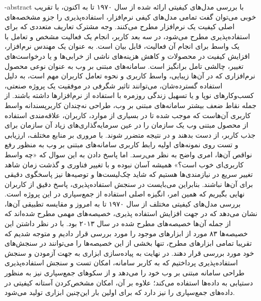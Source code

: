 \fa-abstract{
با بررسی مدل‌های کیفیتی ارائه شده از سال ۱۹۷۰ تا به اکنون، با تقریب خوبی می‌توان گفت تمامی مدل‌های کیفی نرم‌افزار، استفاده‌پذیری را جزو مشخصه‌های اصلی کیفیت یک نرم‌افزار مطرح می‌کنند. وجه مشترک تعاریف متعددی که برای استفاده‌پذیری مطرح می‌شود، در سه بعد کاربر، انجام یک فعالیت مشخص و تعامل با یک واسط برای انجام آن فعالیت، قابل بیان است. به عنوان یک مهندس نرم‌افزار، افزایش کیفیت در محصولات و کاهش هزینه‌های ناشی از خرابی‌ها و یا درخواست‌های تغییر، چالشی تامل برانگیز است. سامانه‌های مبتنی بر وب به عنوان نوعی محصول نرم‌افزاری که در آن‌ها زیبایی، واسط کاربری و نحوه تعامل کاربران مهم است، به دلیل استفاده گسترده‌شان، می‌توانند تاثیر شگرفی در موفقیت یک پروژه صنعتی، کسب‌وکارهای نوپا و یا تسهیل زندگی روزمره با استفاده از نرم‌افزارها داشته باشند. از جمله نقاط ضعف بیشتر سامانه‌های مبتنی بر وب، طراحی نه‌چندان کاربرپسندانه واسط کاربری آن‌هاست که موجب شده تا در بسیاری از موارد، کاربران، علاقه‌مندی استفاده از محصول مبتنی وب یک سازمان را در عین سرمایه‌گذاری‌های زیاد آن سازمان برای جذب کاربر، از دست بدهند و در نتیجه متضرر شوند. با مروری بر منابع مختلف، ارزیابی و تست روی نمونه‌های اولیه رابط کاربری سامانه‌های مبتنی بر وب به منظور رفع نواقص آن‌ها، امری واضح به نظر می‌رسد. اما پاسخ دادن به این سوال که «چه واسط کاربری‌ای خوب است؟» همیشه آسان نبوده و با تغییر فناوری و گذشت زمان شاهد تغییر سریع در نیازمندی‌ها هستیم که شاید چک‌لیست‌ها و توصیه‌ها نیز پاسخگوی دقیقی برای آن‌ها نباشند. بنابراین می‌بایست در سنجش استفاده‌پذیری، پاسخ دقیق از کاربران نهایی بگیریم که همین امر، انگیزه اصلی استفاده از  جمع‌سپاری در این پروژه است. بررسی مدل‌های کیفیتی مختلف از سال ۱۹۷۰ تا به امروز و مقایسه تطبیقی آن‌ها، نشان می‌دهد که در جهت افزایش استفاده پذیری، خصیصه‌های مهمی مطرح شده‌اند که از جمله آن‌ها خصیصه‌های مطرح شده در سال ۲۰۱۳ بود. با در نظر داشتن این خصیصه‌ها  ۸۳ مورد از ابزارهای موجود را مورد بررسی قرار دادیم و متوجه شدیم که تقریبا تمامی ابزارهای مطرح، تنها بخشی از این خصیصه‌ها را می‌توانند در سنجش‌های خود مورد بررسی قرار دهند. در نهایت به پیاده‌سازی ابزاری به جهت آزمودن و سنجش استفاده‌پذیری پرداختیم که به کاربر سامانه، امکان تست و سنجش استفاده‌پذیری طراحی سامانه مبتنی بر وب خود را می‌دهد و از سکوهای جمع‌سپاری نیز به منظور دستیابی به داده‌ها استفاده می‌کند؛ علاوه بر آن، امکان مشخص‌کردن آستانه کیفیتی در داده‌های جمع‌سپاری را نیز دارد که برای اولین بار این‌چنین ابزاری تولید می‌شود.
}





\AUTtitle
